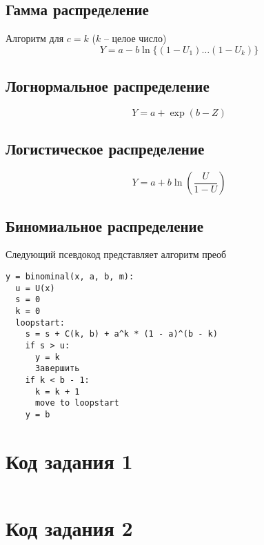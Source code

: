 \documentclass[bachelor, och, pract_otchet]{SCWorks}
\begin{document}
\subsection{Гамма распределение}
Алгоритм для $c = k$ ($k$ -- целое число)
\[ Y = a - b \ln \{(1 - U_1) \dots (1 - U_k)\} \]

\subsection{Логнормальное распределение}
\[ Y = a + \exp(b - Z) \]

\subsection{Логистическое распределение}
\[ Y = a + b \ln(\frac{U}{1 - U})\]

\subsection{Биномиальное распределение}
Следующий псевдокод представляет алгоритм преоб
\begin{verbatim}
y = binominal(x, a, b, m):
  u = U(x)
  s = 0
  k = 0
  loopstart:
    s = s + C(k, b) + a^k * (1 - a)^(b - k)
    if s > u:
      y = k
      Завершить
    if k < b - 1:
      k = k + 1
      move to loopstart
    y = b
\end{verbatim}
\newpage
\appendix
    \section{Код задания 1}
    \inputminted[fontsize=\footnotesize]{text}{main.cpp}

    \section{Код задания 2}
    \inputminted[fontsize=\footnotesize]{text}{main2.cpp}




\end{document}
